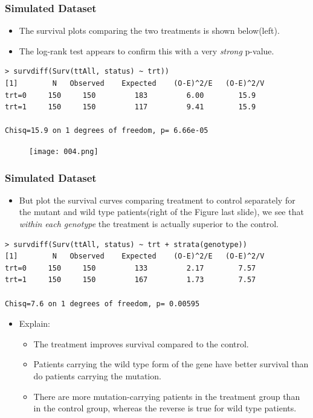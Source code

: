 \documentclass{beamer}
\newcommand{\empr}[1]{{\emph{\color{red}#1}}}
\begin{document}
\pagebreak
\begin{frame}[fragile]
\frametitle{Simulated Dataset}
\begin{itemize}
\item The survival plots comparing the two treatments is shown below(left).
\item The log-rank test appears to confirm this with a very \empr{strong} p-value.
\end{itemize}
\begin{Verbatim}
> survdiff(Surv(ttAll, status) ~ trt))
[1]        N   Observed    Expected    (O-E)^2/E   (O-E)^2/V
trt=0     150     150         183         6.00        15.9
trt=1     150     150         117         9.41        15.9
   
Chisq=15.9 on 1 degrees of freedom, p= 6.66e-05
\end{Verbatim}
\begin{figure}[h!]
	\texttt{[image: 004.png]}
\end{figure}
\end{frame}

\pagebreak
\begin{frame}[fragile]
\frametitle{Simulated Dataset}
\begin{itemize}
\item But plot the survival curves comparing treatment to control separately for the mutant and wild type patients(right of the Figure last slide), we see that \empr{within each genotype} the {\color{red}treatment is actually superior to the control}.
\end{itemize}
\begin{Verbatim}
> survdiff(Surv(ttAll, status) ~ trt + strata(genotype))
[1]        N   Observed    Expected    (O-E)^2/E   (O-E)^2/V
trt=0     150     150         133         2.17        7.57
trt=1     150     150         167         1.73        7.57

Chisq=7.6 on 1 degrees of freedom, p= 0.00595
\end{Verbatim}
\begin{itemize}
\item Explain:
\begin{itemize}
\item The treatment improves survival compared to the control.
\item Patients carrying the wild type form of the gene have better survival than do patients carrying the mutation.
\item There are more mutation-carrying patients in the treatment group than in the control group, whereas the reverse is true for wild type patients.
\end{itemize}
\end{itemize}
\end{frame}
\end{document}
